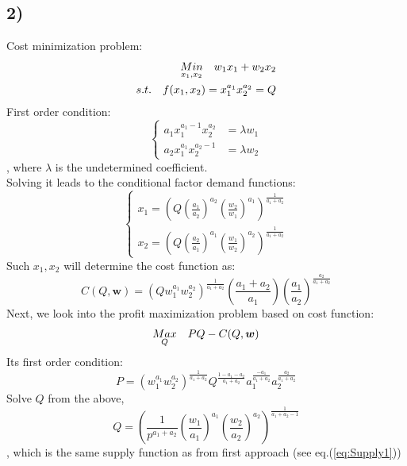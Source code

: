 \documentclass{article}
\begin{document}
\subsection*{2)}
Cost minimization problem:
\begin{align}
\notag \underset{x_1,x_2}{Min}\quad w_1 x_1 + w_2 x_2 \\
\notag s.t.\quad f(x_1,x_2) = x_1^{a_1}x_2^{a_2} = Q
\end{align}
First order condition:
\begin{equation}
	\begin{cases}
	a_1 x_1^{a_1-1} x_2^{a_2} &= \lambda w_1 \\ 
	a_2 x_1^{a_1} x_2^{a_2-1} &= \lambda w_2		
	\end{cases}
\end{equation}
, where $\lambda$ is the undetermined coefficient.\\
Solving it leads to the conditional factor demand functions:
\begin{equation}
	\begin{cases}
		x_1 = (Q (\frac{a_1}{a_2})^{a_2} (\frac{w_2}{w_1})^{a_1})^{\frac{1}{a_1 + a_2}} \\
		x_2 = (Q (\frac{a_2}{a_1})^{a_1} (\frac{w_1}{w_2})^{a_2})^{\frac{1}{a_1 + a_2}}		
	\end{cases}
\end{equation}
Such $x_1, x_2$ will determine the cost function as:
\begin{equation}
	C(Q,\bm{w}) = (Q w^{a_1}_1 w^{a_2}_2)^{\frac{1}{a_1 + a_2}} (\frac{a_1+a_2}{a_1}) (\frac{a_1}{a_2})^{\frac{a_2}{a_1+a_2}}
\end{equation}
Next, we look into the profit maximization problem based on cost function:
\begin{equation}
	\notag \underset{Q}{Max}\quad PQ-C(Q,\bm{w})
\end{equation}
Its first order condition:
\begin{equation}
	P = (w^{a_1}_1 w^{a_2}_2)^{\frac{1}{a_1+a_2}} Q^{\frac{1 - a_1 - a_2}{a_1 + a_2}} a^{\frac{-a_1}{a_1+a_2}}_1 a^{\frac{a_2}{a_1+a_2}}_2
\end{equation}
Solve $Q$ from the above,
\begin{equation}
	Q = (\frac{1}{p^{a_1+a_2}} (\frac{w_1}{a_1})^{a_1} (\frac{w_2}{a_2})^{a_2} )^{\frac{1}{a_1 + a_2 - 1}}
\end{equation}
, which is the same supply function as from first approach (see eq.(\ref{eq:Supply1}))
\end{document}
